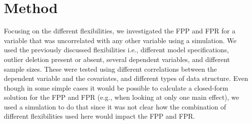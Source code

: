 \section{Method}
Focusing on the different flexibilities, we investigated the FPP and FPR for a variable that was uncorrelated with any other variable using a simulation. We used the previously discussed flexibilities i.e., different model specifications, outlier deletion present or absent, several dependent variables, and different sample sizes. These were tested using different correlations between the dependent variable and the covariates, and different types of data structure. Even though in some simple cases it would be possible to calculate a closed-form solution for the FPP and FPR (e.g., when looking at only one main effect), we used a simulation to do that since it was not clear how the combination of different flexibilities used here would impact the FPP and FPR.\\

